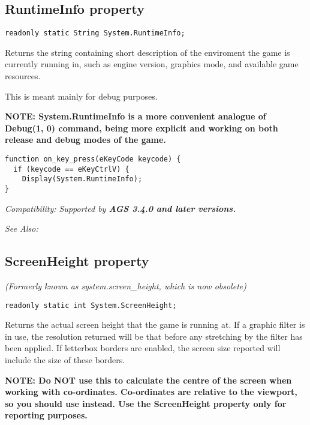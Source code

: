 \subsection{RuntimeInfo property}\label{System.RuntimeInfo}%

\begin{verbatim}
readonly static String System.RuntimeInfo;
\end{verbatim}
Returns the string containing short description of the enviroment the game is currently
running in, such as engine version, graphics mode, and available game resources.

This is meant mainly for debug purposes.

\bf{NOTE:} System.RuntimeInfo is a more convenient analogue of Debug(1, 0) command,
being more explicit and working on both release and debug modes of the game.

\begin{verbatim}
function on_key_press(eKeyCode keycode) {
  if (keycode == eKeyCtrlV) {
    Display(System.RuntimeInfo);
}
\end{verbatim}

\it{Compatibility:} Supported by \bf{AGS 3.4.0} and later versions.

\it{See Also:} 


\subsection{ScreenHeight property}\label{System.ScreenHeight}%

\it{(Formerly known as system.screen_height, which is now obsolete)}

\begin{verbatim}
readonly static int System.ScreenHeight;
\end{verbatim}
Returns the actual screen height that the game is running at.  If a graphic filter is in
use, the resolution returned will be that before any stretching by the filter has been
applied. If letterbox borders are enabled, the screen size reported will include the size
of these borders.

\bf{NOTE:} Do \bf{NOT} use this to calculate the centre of the screen when working
with co-ordinates. Co-ordinates are relative to the viewport, so you should
use  instead. Use the ScreenHeight
property only for reporting purposes.

